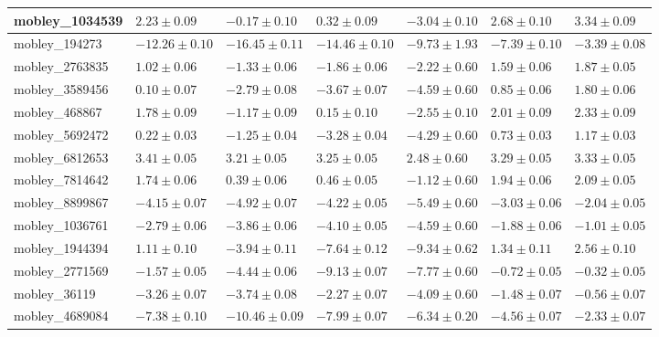 \documentclass{article}
\begin{document}
\begin{landscape}
\begin{longtable}{|l{3.0cm}|l{3.0cm}|l{3.2cm}|l{3.6cm}|l{3.0cm}|l{3.0cm}|l{3.0cm}|}
mobley\_1034539	&	$	2.23	\pm	0.09	$	&	$	-0.17	\pm	0.10	$	&	$	0.32	\pm	0.09	$	&	$	-3.04	\pm	0.10	$	&	$	2.68	\pm	0.10	$	&	$	3.34	\pm	0.09	$	\\ \hline
mobley\_194273	&	$	-12.26	\pm	0.10	$	&	$	-16.45	\pm	0.11	$	&	$	-14.46	\pm	0.10	$	&	$	-9.73	\pm	1.93	$	&	$	-7.39	\pm	0.10	$	&	$	-3.39	\pm	0.08	$	\\ \hline
mobley\_2763835	&	$	1.02	\pm	0.06	$	&	$	-1.33	\pm	0.06	$	&	$	-1.86	\pm	0.06	$	&	$	-2.22	\pm	0.60	$	&	$	1.59	\pm	0.06	$	&	$	1.87	\pm	0.05	$	\\ \hline
mobley\_3589456	&	$	0.10	\pm	0.07	$	&	$	-2.79	\pm	0.08	$	&	$	-3.67	\pm	0.07	$	&	$	-4.59	\pm	0.60	$	&	$	0.85	\pm	0.06	$	&	$	1.80	\pm	0.06	$	\\ \hline
mobley\_468867	&	$	1.78	\pm	0.09	$	&	$	-1.17	\pm	0.09	$	&	$	0.15	\pm	0.10	$	&	$	-2.55	\pm	0.10	$	&	$	2.01	\pm	0.09	$	&	$	2.33	\pm	0.09	$	\\ \hline
mobley\_5692472	&	$	0.22	\pm	0.03	$	&	$	-1.25	\pm	0.04	$	&	$	-3.28	\pm	0.04	$	&	$	-4.29	\pm	0.60	$	&	$	0.73	\pm	0.03	$	&	$	1.17	\pm	0.03	$	\\ \hline
mobley\_6812653	&	$	3.41	\pm	0.05	$	&	$	3.21	\pm	0.05	$	&	$	3.25	\pm	0.05	$	&	$	2.48	\pm	0.60	$	&	$	3.29	\pm	0.05	$	&	$	3.33	\pm	0.05	$	\\ \hline
mobley\_7814642	&	$	1.74	\pm	0.06	$	&	$	0.39	\pm	0.06	$	&	$	0.46	\pm	0.05	$	&	$	-1.12	\pm	0.60	$	&	$	1.94	\pm	0.06	$	&	$	2.09	\pm	0.05	$	\\ \hline
mobley\_8899867	&	$	-4.15	\pm	0.07	$	&	$	-4.92	\pm	0.07	$	&	$	-4.22	\pm	0.05	$	&	$	-5.49	\pm	0.60	$	&	$	-3.03	\pm	0.06	$	&	$	-2.04	\pm	0.05	$	\\ \hline
mobley\_1036761	&	$	-2.79	\pm	0.06	$	&	$	-3.86	\pm	0.06	$	&	$	-4.10	\pm	0.05	$	&	$	-4.59	\pm	0.60	$	&	$	-1.88	\pm	0.06	$	&	$	-1.01	\pm	0.05	$	\\ \hline
mobley\_1944394	&	$	1.11	\pm	0.10	$	&	$	-3.94	\pm	0.11	$	&	$	-7.64	\pm	0.12	$	&	$	-9.34	\pm	0.62	$	&	$	1.34	\pm	0.11	$	&	$	2.56	\pm	0.10	$	\\ \hline
mobley\_2771569	&	$	-1.57	\pm	0.05	$	&	$	-4.44	\pm	0.06	$	&	$	-9.13	\pm	0.07	$	&	$	-7.77	\pm	0.60	$	&	$	-0.72	\pm	0.05	$	&	$	-0.32	\pm	0.05	$	\\ \hline
mobley\_36119	&	$	-3.26	\pm	0.07	$	&	$	-3.74	\pm	0.08	$	&	$	-2.27	\pm	0.07	$	&	$	-4.09	\pm	0.60	$	&	$	-1.48	\pm	0.07	$	&	$	-0.56	\pm	0.07	$	\\ \hline
mobley\_4689084	&	$	-7.38	\pm	0.10	$	&	$	-10.46	\pm	0.09	$	&	$	-7.99	\pm	0.07	$	&	$	-6.34	\pm	0.20	$	&	$	-4.56	\pm	0.07	$	&	$	-2.33	\pm	0.07	$	\\ \hline

\end{longtable}
\end{landscape}
\end{document}
